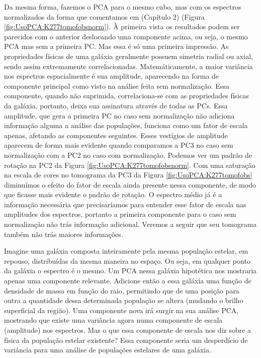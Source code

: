 Da mesma forma, fazemos o PCA para o mesmo cubo, mas com os espectros normalizados da forma que comentamos em \fixme
(Capítulo 2) (Figura \ref{fig:UsoPCA:K277tomofobsnorm}). À primeira vista os resultados podem ser parecidos com o
anterior deslocando uma componente acima, ou seja, o mesmo PCA mas sem a primeira PC. Mas essa é só uma primeira
impressão. As propriedades físicas de uma galáxia geralmente possuem simetria radial ou axial, sendo assim extremamente
correlacionadas. Matemáticamente, a maior variância nos espectros espacialmente é sua amplitude, aparecendo na forma de
componente principal como visto na análise feita sem normalização. Essa componente, quando não suprimida,
correlaciona-se com as propriedades físicas da galáxia, portanto, deixa sua assinatura através de todas as PCs. Essa
amplitude, que gera a primeira PC no caso sem normalização não adiciona informação alguma a análise das populações,
funciona como um fator de escala apenas, afetando as componentes seguintes. Esses vestígios de amplitude aparecem de
forma mais evidente quando comparamos a PC3 no caso sem normalização com a PC2 no caso com normalização. Podemos ver um
padrão de rotação na PC2 da Figura \ref{fig:UsoPCA:K277tomofobsnorm}. Com uma saturação na escala de cores no tomograma
da PC3 da Figura \ref{fig:UsoPCA:K277tomofobs} diminuímos o efeito do fator de escala ainda presente nessa componente,
de modo que ficasse mais evidente o padrão de rotação. O espectro médio já é a informação necessária que precisaríamos
para entender esse fator de escala nas amplitudes dos espectros, portanto a primeira componente para o caso sem
normalização não trás informação adicional. Veremos a seguir que seu tomograma também não trás maiores informações.

Imagine uma galáxia composta inteiramente pela mesma população estelar, em repouso, distribuídas da mesma maneira no
espaço. Ou seja, em qualquer ponto da galáxia o espectro é o mesmo. Um PCA nessa galáxia hipotética nos mostraria apenas
uma componente relevante. Adicione então a essa galáxia uma função de densidade de massa em função do raio, permitindo
que de uma posição para outra a quantidade dessa determinada população se altera (mudando o brilho superficial da
região). Uma componente nova irá surgir na sua análise PCA, mostrando que existe uma variância agora numa componente de
escala (amplitude) nos espectros. Mas o que essa componente de escala nos diz sobre a física da população estelar
existente? Essa componente seria um desperdício de variância para uma análise de populações estelares de uma galáxia.

